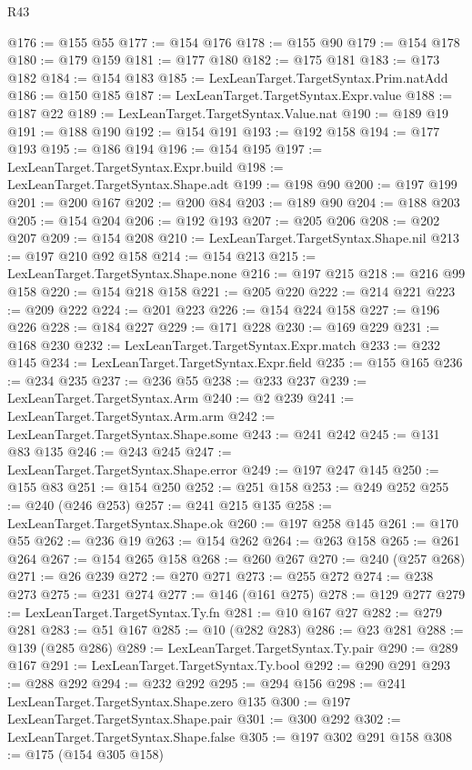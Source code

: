 \begin{lexlean}{R43}
\begin{coremodule}
@176 := @155 @55
@177 := @154 @176
@178 := @155 @90
@179 := @154 @178
@180 := @179 @159
@181 := @177 @180
@182 := @175 @181
@183 := @173 @182
@184 := @154 @183
@185 := LexLeanTarget.TargetSyntax.Prim.natAdd
@186 := @150 @185
@187 := LexLeanTarget.TargetSyntax.Expr.value
@188 := @187 @22
@189 := LexLeanTarget.TargetSyntax.Value.nat
@190 := @189 @19
@191 := @188 @190
@192 := @154 @191
@193 := @192 @158
@194 := @177 @193
@195 := @186 @194
@196 := @154 @195
@197 := LexLeanTarget.TargetSyntax.Expr.build
@198 := LexLeanTarget.TargetSyntax.Shape.adt
@199 := @198 @90
@200 := @197 @199
@201 := @200 @167
@202 := @200 @84
@203 := @189 @90
@204 := @188 @203
@205 := @154 @204
@206 := @192 @193
@207 := @205 @206
@208 := @202 @207
@209 := @154 @208
@210 := LexLeanTarget.TargetSyntax.Shape.nil
@213 := @197 @210 @92 @158
@214 := @154 @213
@215 := LexLeanTarget.TargetSyntax.Shape.none
@216 := @197 @215
@218 := @216 @99 @158
@220 := @154 @218 @158
@221 := @205 @220
@222 := @214 @221
@223 := @209 @222
@224 := @201 @223
@226 := @154 @224 @158
@227 := @196 @226
@228 := @184 @227
@229 := @171 @228
@230 := @169 @229
@231 := @168 @230
@232 := LexLeanTarget.TargetSyntax.Expr.match
@233 := @232 @145
@234 := LexLeanTarget.TargetSyntax.Expr.field
@235 := @155 @165
@236 := @234 @235
@237 := @236 @55
@238 := @233 @237
@239 := LexLeanTarget.TargetSyntax.Arm
@240 := @2 @239
@241 := LexLeanTarget.TargetSyntax.Arm.arm
@242 := LexLeanTarget.TargetSyntax.Shape.some
@243 := @241 @242
@245 := @131 @83 @135
@246 := @243 @245
@247 := LexLeanTarget.TargetSyntax.Shape.error
@249 := @197 @247 @145
@250 := @155 @83
@251 := @154 @250
@252 := @251 @158
@253 := @249 @252
@255 := @240 (@246 @253)
@257 := @241 @215 @135
@258 := LexLeanTarget.TargetSyntax.Shape.ok
@260 := @197 @258 @145
@261 := @170 @55
@262 := @236 @19
@263 := @154 @262
@264 := @263 @158
@265 := @261 @264
@267 := @154 @265 @158
@268 := @260 @267
@270 := @240 (@257 @268)
@271 := @26 @239
@272 := @270 @271
@273 := @255 @272
@274 := @238 @273
@275 := @231 @274
@277 := @146 (@161 @275)
@278 := @129 @277
@279 := LexLeanTarget.TargetSyntax.Ty.fn
@281 := @10 @167 @27
@282 := @279 @281
@283 := @51 @167
@285 := @10 (@282 @283)
@286 := @23 @281
@288 := @139 (@285 @286)
@289 := LexLeanTarget.TargetSyntax.Ty.pair
@290 := @289 @167
@291 := LexLeanTarget.TargetSyntax.Ty.bool
@292 := @290 @291
@293 := @288 @292
@294 := @232 @292
@295 := @294 @156
@298 := @241 LexLeanTarget.TargetSyntax.Shape.zero @135
@300 := @197 LexLeanTarget.TargetSyntax.Shape.pair
@301 := @300 @292
@302 := LexLeanTarget.TargetSyntax.Shape.false
@305 := @197 @302 @291 @158
@308 := @175 (@154 @305 @158)

\end{coremodule}
\end{lexlean}
